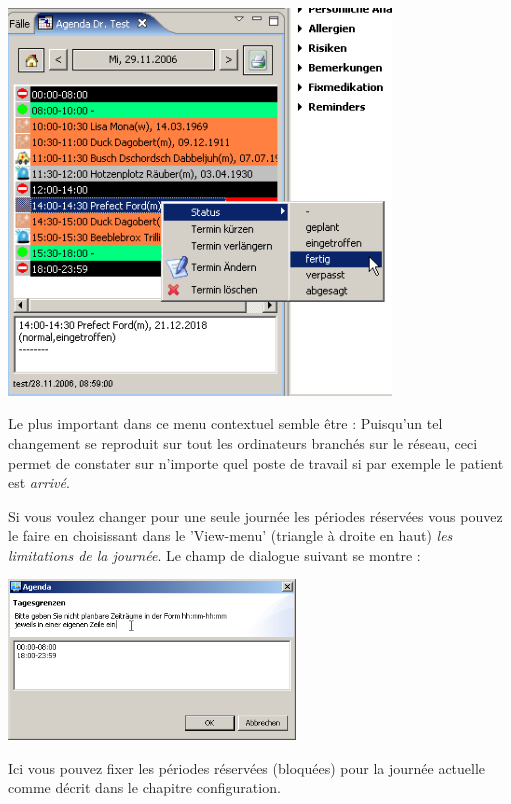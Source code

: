 \includegraphics[width=4in]{images/use5.png}

Le plus important dans ce menu contextuel semble être : Puisqu'un tel changement se reproduit sur tout les ordinateurs branchés sur le réseau, ceci permet de constater sur n'importe quel poste de travail si par exemple le patient est \textit{arrivé}.

Si vous voulez changer pour une seule journée les périodes réservées vous pouvez le faire en choisissant dans le 'View-menu' (triangle à droite en haut)  \textit{les limitations de la journée}. Le champ de dialogue suivant se montre :

\includegraphics[width=3in]{images/use3.png}

Ici vous pouvez fixer les périodes réservées (bloquées) pour la journée actuelle comme décrit dans le chapitre configuration.

